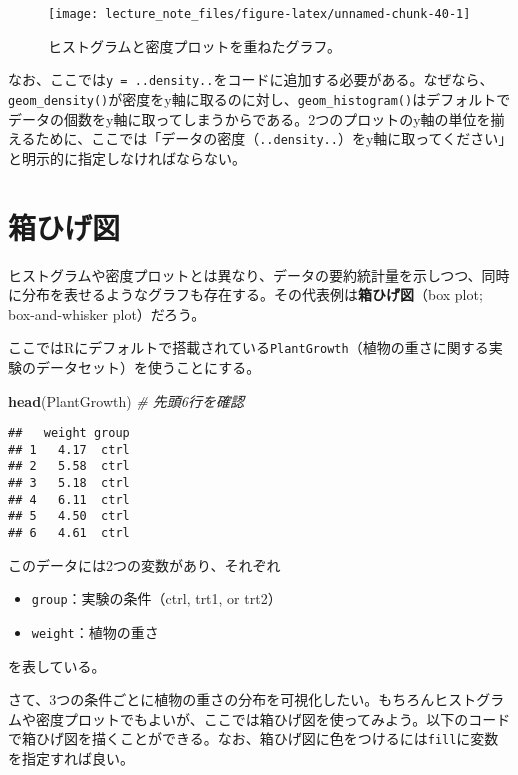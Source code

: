 \documentclass[]{book}
\newenvironment{Shaded}{\begin{snugshade}}{\end{snugshade}}
\newcommand{\KeywordTok}[1]{\textcolor[rgb]{0.13,0.29,0.53}{\textbf{#1}}}
\newcommand{\CommentTok}[1]{\textcolor[rgb]{0.56,0.35,0.01}{\textit{#1}}}
\newcommand{\NormalTok}[1]{#1}
\begin{document}
\begin{figure}

{\centering \texttt{[image: lecture\_note\_files/figure-latex/unnamed-chunk-40-1]} 

}

\caption{ヒストグラムと密度プロットを重ねたグラフ。}\label{fig:unnamed-chunk-40}
\end{figure}

なお、ここでは\texttt{y\ =\ ..density..}をコードに追加する必要がある。なぜなら、\texttt{geom\_density()}が密度をy軸に取るのに対し、\texttt{geom\_histogram()}はデフォルトでデータの個数をy軸に取ってしまうからである。2つのプロットのy軸の単位を揃えるために、ここでは「データの密度（\texttt{..density..}）をy軸に取ってください」と明示的に指定しなければならない。

\section{箱ひげ図}

ヒストグラムや密度プロットとは異なり、データの要約統計量を示しつつ、同時に分布を表せるようなグラフも存在する。その代表例は\textbf{箱ひげ図}（box
plot; box-and-whisker plot）だろう。

ここではRにデフォルトで搭載されている\texttt{PlantGrowth}（植物の重さに関する実験のデータセット）を使うことにする。

\begin{Shaded}
\begin{Highlighting}[]
\KeywordTok{head}\NormalTok{(PlantGrowth) }\CommentTok{# 先頭6行を確認}
\end{Highlighting}
\end{Shaded}

\begin{verbatim}
##   weight group
## 1   4.17  ctrl
## 2   5.58  ctrl
## 3   5.18  ctrl
## 4   6.11  ctrl
## 5   4.50  ctrl
## 6   4.61  ctrl
\end{verbatim}

このデータには2つの変数があり、それぞれ

\begin{itemize}
\item
  \texttt{group}：実験の条件（ctrl, trt1, or trt2）
\item
  \texttt{weight}：植物の重さ
\end{itemize}

を表している。

さて、3つの条件ごとに植物の重さの分布を可視化したい。もちろんヒストグラムや密度プロットでもよいが、ここでは箱ひげ図を使ってみよう。以下のコードで箱ひげ図を描くことができる。なお、箱ひげ図に色をつけるには\texttt{fill}に変数を指定すれば良い。
\end{document}
